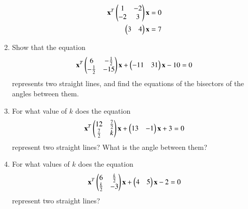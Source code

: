 \begin{enumerate}[label=\arabic*.,ref=\thesubsection.\theenumi]
\begin{align}
\mathbf{x}^T
\begin{pmatrix}1 & -{2}\\-{2} & 3\end{pmatrix} 
\mathbf{x} = 0
\\
\begin{pmatrix}3&4\end{pmatrix}\mathbf{x}=7
\end{align}
\renewcommand{\theequation}{\theenumi}
\item Show that the equation
\begin{align}
\mathbf{x}^T
\begin{pmatrix}6 & -\frac{1}{2}\\-\frac{1}{2} & -15\end{pmatrix} 
\mathbf{x} 
+\begin{pmatrix}-11&31\end{pmatrix}\mathbf{x}-10=0
\end{align}
represents two straight lines, and find the equations of the bisectors of the angles between them.
\item For what value of $k$ does the equation
\begin{align}
\mathbf{x}^T
\begin{pmatrix}12 & \frac{7}{2}\\\frac{7}{2} & k\end{pmatrix} 
\mathbf{x} 
+\begin{pmatrix}13&-1\end{pmatrix}\mathbf{x}+3=0
\end{align}
represent two straight lines? What is the angle between them?
\item For what values of $k$ does the equation
\begin{align}
\mathbf{x}^T
\begin{pmatrix}6 & \frac{k}{2}\\\frac{k}{2} & -3\end{pmatrix} 
\mathbf{x} 
+\begin{pmatrix}4&5\end{pmatrix}\mathbf{x}-2=0
\end{align}
represent two straight lines?
\end{enumerate}
